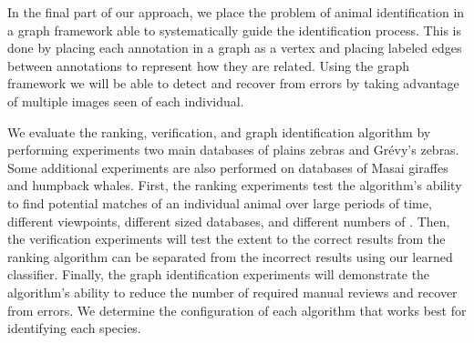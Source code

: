     In the final part of our approach, we place the problem of animal identification in a graph framework able to
    systematically guide the identification process. This is done by placing each annotation in a graph as a vertex and
    placing labeled edges between annotations to represent how they are related. Using the graph framework we will be
    able to detect and recover from errors by taking advantage of multiple images seen of each individual.

    We evaluate the ranking, verification, and graph identification algorithm by performing experiments two main
    databases of plains zebras and Grévy's zebras. Some additional experiments are also performed on databases of Masai
    giraffes and humpback whales. First, the ranking experiments test the algorithm's ability to find potential matches
    of an individual animal over large periods of time, different viewpoints, different sized databases, and different
    numbers of \exemplars{}. Then, the verification experiments will test the extent to the correct results from the
    ranking algorithm can be separated from the incorrect results using our learned classifier. Finally, the graph
    identification experiments will demonstrate the algorithm's ability to reduce the number of required manual reviews
    and recover from errors. We determine the configuration of each algorithm that works best for identifying each
    species.
    
    


